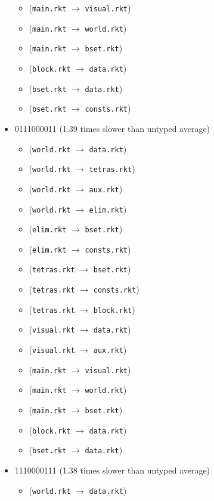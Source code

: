 \documentclass{article}
\newcommand{\mono}[1]{\texttt{#1}}
\begin{document}
\begin{itemize}
\begin{itemize}
  \item (\mono{main.rkt} $\rightarrow$ \mono{visual.rkt})
  \item (\mono{main.rkt} $\rightarrow$ \mono{world.rkt})
  \item (\mono{main.rkt} $\rightarrow$ \mono{bset.rkt})
  \item (\mono{block.rkt} $\rightarrow$ \mono{data.rkt})
  \item (\mono{bset.rkt} $\rightarrow$ \mono{data.rkt})
  \item (\mono{bset.rkt} $\rightarrow$ \mono{consts.rkt})
  \end{itemize}
\item 0111000011 (1.39 times slower than untyped average)
  \begin{itemize}
  \item (\mono{world.rkt} $\rightarrow$ \mono{data.rkt})
  \item (\mono{world.rkt} $\rightarrow$ \mono{tetras.rkt})
  \item (\mono{world.rkt} $\rightarrow$ \mono{aux.rkt})
  \item (\mono{world.rkt} $\rightarrow$ \mono{elim.rkt})
  \item (\mono{elim.rkt} $\rightarrow$ \mono{bset.rkt})
  \item (\mono{elim.rkt} $\rightarrow$ \mono{consts.rkt})
  \item (\mono{tetras.rkt} $\rightarrow$ \mono{bset.rkt})
  \item (\mono{tetras.rkt} $\rightarrow$ \mono{consts.rkt})
  \item (\mono{tetras.rkt} $\rightarrow$ \mono{block.rkt})
  \item (\mono{visual.rkt} $\rightarrow$ \mono{data.rkt})
  \item (\mono{visual.rkt} $\rightarrow$ \mono{aux.rkt})
  \item (\mono{main.rkt} $\rightarrow$ \mono{visual.rkt})
  \item (\mono{main.rkt} $\rightarrow$ \mono{world.rkt})
  \item (\mono{main.rkt} $\rightarrow$ \mono{bset.rkt})
  \item (\mono{block.rkt} $\rightarrow$ \mono{data.rkt})
  \item (\mono{bset.rkt} $\rightarrow$ \mono{data.rkt})
  \end{itemize}
\item 1110000111 (1.38 times slower than untyped average)
  \begin{itemize}
  \item (\mono{world.rkt} $\rightarrow$ \mono{data.rkt})

\end{itemize}
\end{itemize}
\end{document}
